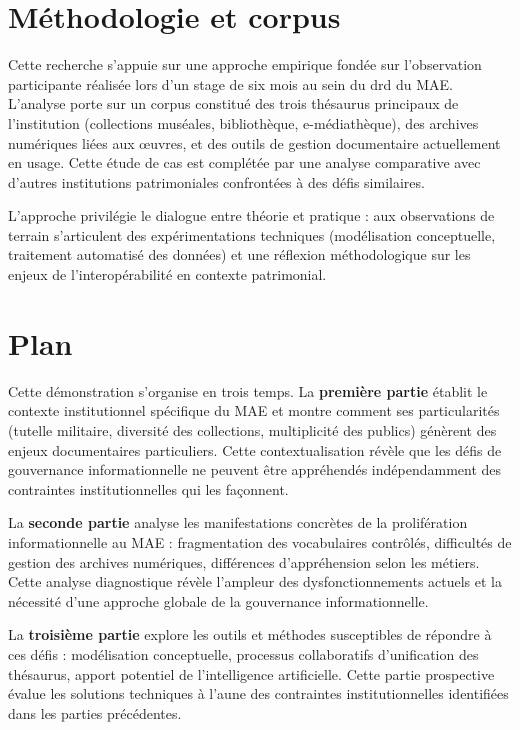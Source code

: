 \section*{Méthodologie et corpus}

Cette recherche s'appuie sur une approche empirique fondée sur l'observation participante réalisée lors d'un stage de six mois au sein du \ac{drd} du MAE. L'analyse porte sur un corpus constitué des trois thésaurus principaux de l'institution (collections muséales, bibliothèque, e-médiathèque), des archives numériques liées aux œuvres, et des outils de gestion documentaire actuellement en usage. Cette étude de cas est complétée par une analyse comparative avec d'autres institutions patrimoniales confrontées à des défis similaires.

L'approche privilégie le dialogue entre théorie et pratique : aux observations de terrain s'articulent des expérimentations techniques (modélisation conceptuelle, traitement automatisé des données) et une réflexion méthodologique sur les enjeux de l'interopérabilité en contexte patrimonial.

\section*{Plan}

Cette démonstration s'organise en trois temps. La \textbf{première partie} établit le contexte institutionnel spécifique du MAE et montre comment ses particularités (tutelle militaire, diversité des collections, multiplicité des publics) génèrent des enjeux documentaires particuliers. Cette contextualisation révèle que les défis de gouvernance informationnelle ne peuvent être appréhendés indépendamment des contraintes institutionnelles qui les façonnent.

La \textbf{seconde partie} analyse les manifestations concrètes de la prolifération informationnelle au MAE : fragmentation des vocabulaires contrôlés, difficultés de gestion des archives numériques, différences d'appréhension selon les métiers. Cette analyse diagnostique révèle l'ampleur des dysfonctionnements actuels et la nécessité d'une approche globale de la gouvernance informationnelle.

La \textbf{troisième partie} explore les outils et méthodes susceptibles de répondre à ces défis : modélisation conceptuelle, processus collaboratifs d'unification des thésaurus, apport potentiel de l'intelligence artificielle. Cette partie prospective évalue les solutions techniques à l'aune des contraintes institutionnelles identifiées dans les parties précédentes.

